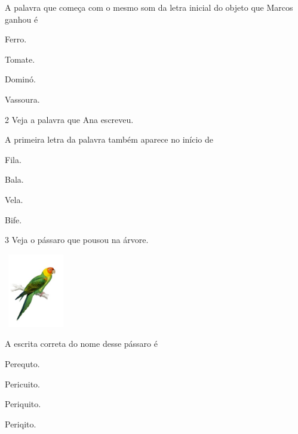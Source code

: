 
A palavra que começa com o mesmo som da letra inicial do objeto que
Marcos ganhou é

\begin{escolha}
\item Ferro.

\item Tomate.

\item Dominó.

\item Vassoura.
\end{escolha}

\num{2} Veja a palavra que Ana escreveu.


A primeira letra da palavra também aparece no início de 

\begin{escolha}
\item Fila.

\item Bala.

\item Vela.

\item Bife.
\end{escolha}

\num{3} Veja o pássaro que pousou na árvore.

\includegraphics[width=1.08542in,height=1.27222in]{media/image165.jpeg}


A escrita correta do nome desse pássaro é

\begin{escolha}
\item Perequto.

\item Pericuito.

\item Periquito.

\item Periqito.
\end{escolha}

